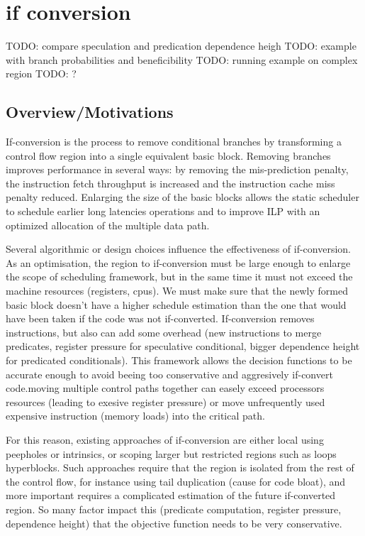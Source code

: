 \chapter{if conversion }
\graphicspath{{img/}{/if_conversion/img}{part4/if_conversion/img/}}

\newcommand\cond{~?~}

TODO: compare speculation and predication dependence heigh
TODO: example with branch probabilities and beneficibility
TODO: running example on complex region
TODO: ?

\section{Overview/Motivations}

If-conversion is the process to remove conditional branches by transforming a control flow region into a single equivalent basic block. Removing branches improves performance in several ways: by removing the mis-prediction penalty, the instruction fetch throughput is increased and the instruction cache miss penalty reduced. Enlarging the size of the basic blocks allows the static scheduler to schedule earlier long latencies operations and to improve ILP with an optimized allocation of the multiple data path. 

Several algorithmic or design choices influence the effectiveness of if-conversion. As an optimisation, the region to if-conversion must be large enough to enlarge the scope of scheduling framework, but in the same time it must not exceed the machine resources (registers, cpus). We must make sure that the newly formed basic block doesn't have a higher schedule estimation than the one that would have been taken if the code was not if-converted. If-conversion removes instructions, but also can add some overhead (new instructions to merge predicates, register pressure for speculative conditional, bigger dependence height for predicated conditionals). This framework allows the decision functions to be accurate enough to avoid beeing too conservative and aggresively if-convert code.moving multiple control paths together can easely exceed processors resources (leading to exesive register pressure) or move unfrequently used expensive instruction (memory loads) into the critical path. 

For this reason, existing approaches of if-conversion are either local using peepholes or intrinsics, or scoping larger but restricted regions such as loops hyperblocks. Such approaches require that the region is isolated from the rest of the control flow, for instance using tail duplication (cause for code bloat), and more important requires a complicated estimation of the future if-converted region. So many factor impact this (predicate computation, register pressure, dependence height) that the objective function needs to be very conservative. 

